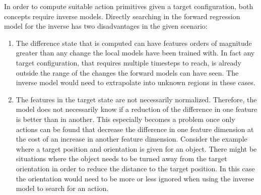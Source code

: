 In order to compute suitable action primitives given a target configuration, both concepts require inverse models.
Directly searching in the forward regression model for the inverse has two disadvantages in the given scenario: 

\begin{enumerate}
\item The difference state that is computed can have features orders of magnitude greater than any change the local models have been trained with. In fact any target configuration, that requires multiple timesteps to reach, is already outside the range of the changes the forward models can have seen. 
The inverse model would need to extrapolate into unknown regions in these cases.
\item The features in the target state are not necessarily normalized. Therefore, the model does not necessarily know if a reduction of the difference in one feature is better than in another. This especially becomes a problem once only actions can be found that decrease the difference in one feature dimension at the cost of an increase in another feature dimension. Consider the example where a target position and orientation is given for an object. There might be situations where the object needs to be turned away from the target orientation in order to reduce the distance to the target position. In this case the orientation would need to be more or less ignored when using the inverse model to search for an action.
\end{enumerate}

